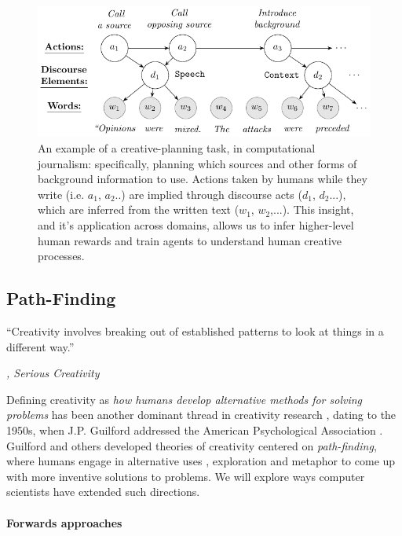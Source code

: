 \documentclass[11pt]{article}
\begin{document}
\begin{figure}
    \centering
    \includegraphics[width=0.95\linewidth]{latex/tikz_diagram.pdf}
    \caption{An example of a creative-planning task, in computational journalism: specifically, planning which sources and other forms of background information to use. Actions taken by humans while they write (i.e.  $a_1$, $a_2$..) are implied through discourse acts ($d_1$, $d_2$...), which are inferred from the written text ($w_1$, $w_2$,...). This insight, and it's application across domains, allows us to infer higher-level human rewards and train agents to understand human creative processes.}
    \label{fig:planning}
\end{figure}

\subsection{Path-Finding}

\epigraph{
``Creativity involves breaking out of established patterns to look at things in a different way.''
}{\textit{, \textit{Serious Creativity}}}

Defining creativity as \textit{how humans develop alternative methods for solving problems} has been another dominant thread in creativity research \cite{runco2001introduction}, dating to the 1950s, when J.P. Guilford addressed the American Psychological Association \cite{guilford1950creativity}. Guilford and others developed theories of creativity centered on \textit{path-finding}, where humans engage in alternative uses \cite{guilford1978alternate}, exploration \cite{finke1996imagery} and metaphor \cite{gentner2014metaphor} to come up with more inventive solutions to problems. We will explore ways computer scientists have extended such directions.

\paragraph{Forwards approaches}
\end{document}
